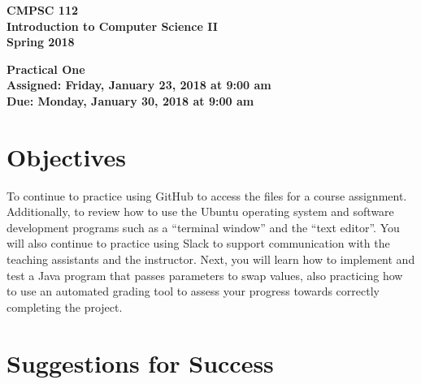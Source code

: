 \documentclass[11pt]{article}
\newcommand{\assignmentduedate}{January 30}
\newcommand{\assignmentassignedate}{January 23}
\newcommand{\assignmentnumber}{One}
\newcommand{\labyear}{2018}
\newcommand{\labdueday}{Monday}
\newcommand{\labassignday}{Friday}
\newcommand{\labtime}{9:00 am}
\newcommand{\assigneddate}{Assigned: \labassignday, \assignmentassignedate, \labyear{} at \labtime{}}
\newcommand{\duedate}{Due: \labdueday, \assignmentduedate, \labyear{} at \labtime{}}
\newcommand{\labtitle}[1]
{
  \begin{center}
    \begin{center}
      \bf
      CMPSC 112\\Introduction to Computer Science II\\
      Spring 2018\\
      \medskip
    \end{center}
    \bf
    #1
  \end{center}
}
\begin{document}
\thispagestyle{empty}

\labtitle{Practical \assignmentnumber{} \\ \assigneddate{} \\ \duedate{}}

\section*{Objectives}

To continue to practice using GitHub to access the files for a course
assignment. Additionally, to review how to use the Ubuntu operating system and
software development programs such as a ``terminal window'' and the ``text
editor''. You will also continue to practice using Slack to support
communication with the teaching assistants and the instructor. Next, you will
learn how to implement and test a Java program that passes parameters to swap
values, also practicing how to use an automated grading tool to assess your
progress towards correctly completing the project.

\section*{Suggestions for Success}
\end{document}
